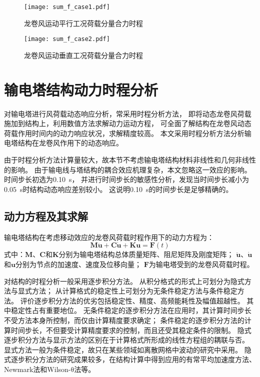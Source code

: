 \begin{figure}[!htpb]
    \centering
    \texttt{[image: sum\_f\_case1.pdf]}
    \caption{龙卷风运动平行工况荷载分量合力时程}
    \label{fig:sum_f_case1}
\end{figure}

\begin{figure}[!htpb]
    \centering
    \texttt{[image: sum\_f\_case2.pdf]}
    \caption{龙卷风运动垂直工况荷载分量合力时程}
    \label{fig:sum_f_case2}
\end{figure}

\section{输电塔结构动力时程分析}
对输电塔进行风荷载动态响应分析，常采用时程分析方法，
即将动态龙卷风荷载施加到结构上，利用数值方法求解动力运动方程，
可全面了解结构在龙卷风动态荷载作用时间内的动力响应状况，求解精度较高。
本文采用时程分析方法分析输电塔结构在龙卷风作用下的动态响应。

由于时程分析方法计算量较大，故本节不考虑输电塔结构材料非线性和几何非线性的影响。
由于输电线与塔结构的耦合效应机理复杂，本文忽略这一效应的影响。
时间步长初选为\SI{0.10}{s}，
并进行时间步长的敏感性分析，发现当时间步长减小为\SI{0.05}{s}时结构动态响应差别较小。
这说明\SI{0.10}{s}的时间步长是足够精确的。

\subsection{动力方程及其求解}
输电塔结构在考虑移动效应的龙卷风荷载时程作用下的动力方程为：
\begin{equation}\label{eqn:dynamic}
    \bm{M}\ddot{\bm{u}}+\bm{C}\dot{\bm{u}}+\bm{K}\bm{u} = \bm{F}(t)
\end{equation}
式中：$\bm{M}$、$\bm{C}$和$\bm{K}$分别为输电塔结构总体质量矩阵、阻尼矩阵及刚度矩阵；
$\ddot{\bm{u}}$、$\dot{\bm{u}}$和$\bm{u}$分别为节点的加速度、速度及位移向量；
$\bm{F}$为输电塔受到的龙卷风荷载时程。

对结构的时程分析一般采用逐步积分方法。
从积分格式的形式上可划分为隐式方法与显式方法；
从计算格式的稳定性上可划分为无条件稳定方法与条件稳定方法。
评价逐步积分方法的优劣包括稳定性、精度、高频能耗性及幅值超越性。
其中稳定性占有重要地位。
无条件稳定的逐步积分方法在应用时，其计算时间步长不受方法本身所控制，而仅由计算精度要求确定；
条件稳定的逐步积分方法的计算时间步长，不但要受计算精度要求的控制，而且还受其稳定条件的限制。
隐式逐步积分方法与显示方法的区别在于计算格式所形成的线性方程组的耦联与否。
显式方法一般为条件稳定，故只在某些领域如离散网格中波动的研究中采用。
隐式逐步积分方法的研究成果较多，在结构计算中得到应用的有常平均加速度方法、Newmark法和Wilson-$\mathrm{\theta}$法等。


